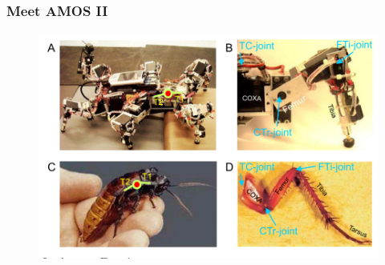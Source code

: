 \documentclass{beamer}
\begin{document}
\begin{frame}
\frametitle{Meet AMOS II}
\begin{figure}
\center
\includegraphics[width=1\textwidth]{figs/AMOSII-cockroach.pdf}
\end{figure}
\end{frame}
\end{document}
